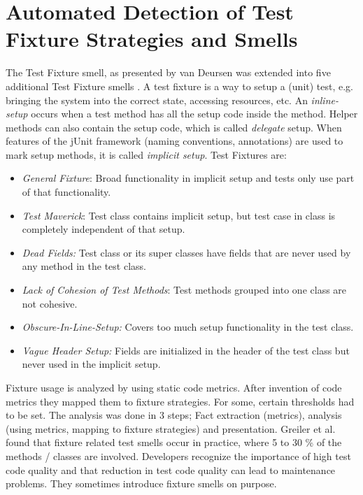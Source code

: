 \documentclass{uvamscse}
\newcommand{\Afixture}{Greiler et al.}
\begin{document}
\section{Automated Detection of Test Fixture Strategies and Smells}
The Test Fixture smell, as presented by van Deursen \cite{van2001refactoring} was extended into five additional Test Fixture smells \cite{greiler2013automated}. A test fixture is a way to setup a (unit) test, e.g. bringing the system into the correct state, accessing resources, etc. An \textit{inline-setup} occurs when a test method has all the setup code inside the method. Helper methods can also contain the setup code, which is called \textit{delegate} setup. When features of the jUnit framework (naming conventions, annotations) are used to mark setup methods, it is called \textit{implicit setup}. Test Fixtures are:

\begin{itemize}
	\item \textit{General Fixture}: Broad functionality in implicit setup and tests only use part of that functionality.
	\item\textit{ Test Maverick}: Test class contains implicit setup, but test case in class is completely independent of that setup.
	\item \textit{Dead Fields:} Test class or its super classes have fields that are never used by any method in the test class.
	\item \textit{Lack of Cohesion of Test Methods}: Test methods grouped into one class are not cohesive.
	\item \textit{Obscure-In-Line-Setup:} Covers too much setup functionality in the test class.
	\item \textit{Vague Header Setup:} Fields are initialized in the header of the test class but never used in the implicit setup.
\end{itemize}
	
Fixture usage is analyzed by using static code metrics. After invention of code metrics they mapped them to fixture strategies. For some, certain thresholds had to be set. The analysis was done in 3 steps; Fact extraction (metrics), analysis (using metrics, mapping to fixture strategies) and presentation. \Afixture{} found that fixture related test smells occur in practice, where 5 to 30 \% of the methods / classes are involved. Developers recognize the importance of high test code quality and that reduction in test code quality can lead to maintenance problems. They sometimes introduce fixture smells on purpose.
\end{document}
